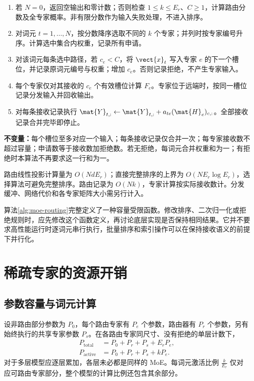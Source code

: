 \documentclass[../textbook.tex]{subfiles}
\begin{document}
\begin{algorithm}[带显式容量规则的稀疏专家前向]\label{alg:moe-routing}
\begin{enumerate}
\item 若 $N=0$，返回空输出和零计数；否则检查 $1\le k\le E_r$、$C\ge1$，计算路由分数及全专家概率。非有限分数作为输入失败处理，不进入排序。
\item 对词元 $t=1,\ldots,N$，按分数降序选取不同的 $k$ 个专家；并列时按专家编号升序。计算选中集合内权重，记录所有申请。
\item 对该词元每条选中路径，若 $c_e<C$，将 $\vect{x}_t$ 写入专家 $e$ 的下一个槽位，并记录原词元编号与权重；增加 $c_e$。否则记录拒绝，不产生专家输入。
\item 每个专家仅对其接收的 $c_e$ 个有效槽位计算 $F_e$。专家位于远端时，按同一槽位记录分发输入并回收输出。
\item 对每条接收记录执行 $\mat{Y}_{t,:}\leftarrow \mat{Y}_{t,:}+a_{te}(\mat{H}_e)_{c,:}$。全部接收记录合并完毕即停止。
\end{enumerate}
\textbf{不变量：}每个槽位至多对应一个输入；每条接收记录仅合并一次；每专家接收数不超过容量；申请数等于接收数加拒绝数。若无拒绝，每词元合并权重和为一；有拒绝时本算法不再要求这一行和为一。

路由线性投影计算量为 $O(NdE_r)$；直接完整排序的上界为 $O(NE_r\log E_r)$，选择算法可避免完整排序。路由记录为 $O(Nk)$，专家计算按实际接收数计。分发缓冲、网络代价和各专家矩阵大小需另行计入。
\end{algorithm}
算法\ref{alg:moe-routing}完整定义了一种容量受限函数。修改排序、二次归一化或拒绝规则时，应先修改这个函数定义，再讨论底层实现是否保持相同结果。它并不要求高性能运行时逐词元串行执行，批量排序和索引操作可以在保持接收语义的前提下并行化。

\section{稀疏专家的资源开销}

\subsection{参数容量与词元计算}
设非路由部分参数为 $P_0$，每个路由专家有 $P_e$ 个参数，路由器有 $P_r$ 个参数，另有始终执行的共享专家参数 $P_s$。在各路由专家同尺寸、没有拒绝的单层计数下，
\begin{equation}
\begin{aligned}
 P_{\mathrm{total}} &= P_0+P_r+P_s+E_rP_e, \\
 P_{\mathrm{active}} &= P_0+P_r+P_s+kP_e.
\end{aligned}
\end{equation}
对于多层模型应逐层累加，各层未必都是同样的 MoE。每词元激活比例 $\frac{k}{E_r}$ 仅对应可路由专家部分，整个模型的计算比例还包含其余部分。
\end{document}
